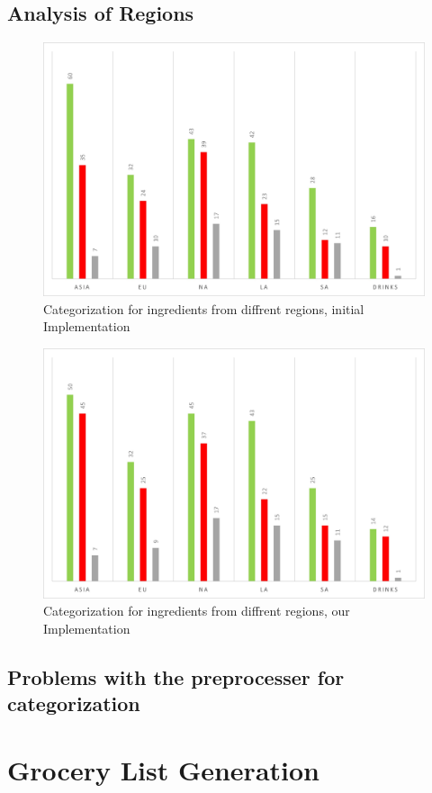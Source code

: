 \subsection{Analysis of Regions}
\begin{figure}
	\centering
	\includegraphics[scale=0.5]{Figures/regions_asela.jpg}
	\caption[Categorization for ingredients from diffrent regions, initial Implementation]{Categorization for ingredients from diffrent regions, initial Implementation}\label{fig:reg_asela}
\end{figure}
\begin{figure}
	\centering
	\includegraphics[scale=0.5]{Figures/regions_mm.jpg}
	\caption[Categorization for ingredients from diffrent regions, our Implementation]{Categorization for ingredients from diffrent regions, our Implementation}\label{fig:reg_mm}
\end{figure}

\subsection{Problems with the preprocesser for categorization}\label{sub:problem}
\section{Grocery List Generation}\label{sec:eval_list}


